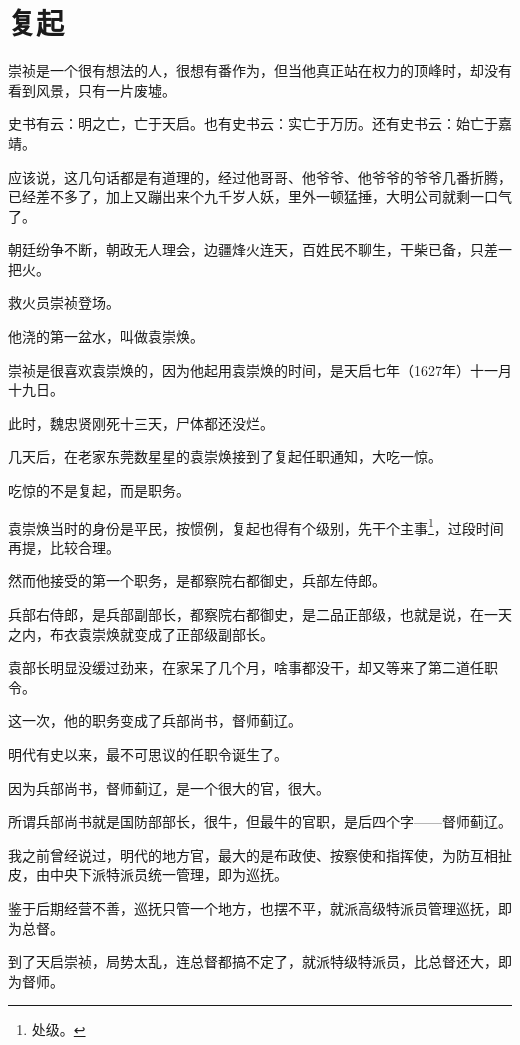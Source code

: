 \section{复起}
\ifnum{}
	\begin{multicols}{\theparacolNo}
\fi
崇祯是一个很有想法的人，很想有番作为，但当他真正站在权力的顶峰时，却没有看到风景，只有一片废墟。

史书有云：明之亡，亡于天启。也有史书云：实亡于万历。还有史书云：始亡于嘉靖。

应该说，这几句话都是有道理的，经过他哥哥、他爷爷、他爷爷的爷爷几番折腾，已经差不多了，加上又蹦出来个九千岁人妖，里外一顿猛捶，大明公司就剩一口气了。

朝廷纷争不断，朝政无人理会，边疆烽火连天，百姓民不聊生，干柴已备，只差一把火。

救火员崇祯登场。

他浇的第一盆水，叫做袁崇焕。

崇祯是很喜欢袁崇焕的，因为他起用袁崇焕的时间，是天启七年（1627年）十一月十九日。

此时，魏忠贤刚死十三天，尸体都还没烂。

几天后，在老家东莞数星星的袁崇焕接到了复起任职通知，大吃一惊。

吃惊的不是复起，而是职务。

袁崇焕当时的身份是平民，按惯例，复起也得有个级别，先干个主事\footnote{处级。}，过段时间再提，比较合理。

然而他接受的第一个职务，是都察院右都御史，兵部左侍郎。

兵部右侍郎，是兵部副部长，都察院右都御史，是二品正部级，也就是说，在一天之内，布衣袁崇焕就变成了正部级副部长。

袁部长明显没缓过劲来，在家呆了几个月，啥事都没干，却又等来了第二道任职令。

这一次，他的职务变成了兵部尚书，督师蓟辽。

明代有史以来，最不可思议的任职令诞生了。

因为兵部尚书，督师蓟辽，是一个很大的官，很大。

所谓兵部尚书就是国防部部长，很牛，但最牛的官职，是后四个字——督师蓟辽。

我之前曾经说过，明代的地方官，最大的是布政使、按察使和指挥使，为防互相扯皮，由中央下派特派员统一管理，即为巡抚。

鉴于后期经营不善，巡抚只管一个地方，也摆不平，就派高级特派员管理巡抚，即为总督。

到了天启崇祯，局势太乱，连总督都搞不定了，就派特级特派员，比总督还大，即为督师。


\end{multicols}

